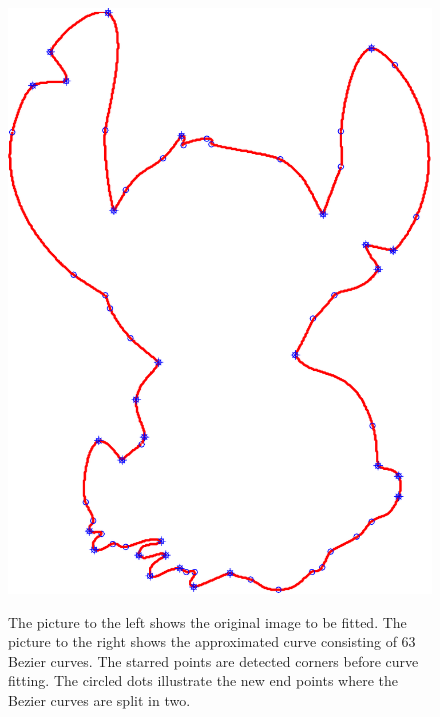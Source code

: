 \documentclass[10pt]{article}
\begin{document}
\begin{figure}
\begin{minipage}[t]{.5\textwidth}
\centering
\vspace{0pt}
    \includegraphics[scale=0.45]{figure5-crop.pdf}
    \label{fig:cornerdet}
\end{minipage}\hfill
\caption{The picture to the left shows the original image to be fitted. The picture to the right shows the approximated curve consisting of 63 Bezier curves. The starred points are detected corners before curve fitting. The circled dots illustrate the new end points where the Bezier curves are split in two.}
\label{fig:stitch}
\end{figure}
\end{document}
